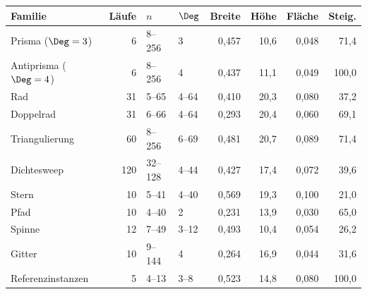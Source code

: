 \begin{tabular}{@{}lrllrrrr@{}}
\toprule
Familie & L\"aufe & $n$ & $\Deg$ & Breite & H\"ohe & Fl\"ache & Steig. \\
\midrule
Prisma ($\Deg=3$) & 6 & 8--256 & 3 & 0{,}457 & 10{,}6 & 0{,}048 & 71{,}4 \\
Antiprisma ($\Deg=4$) & 6 & 8--256 & 4 & 0{,}437 & 11{,}1 & 0{,}049 & 100{,}0 \\
Rad & 31 & 5--65 & 4--64 & 0{,}410 & 20{,}3 & 0{,}080 & 37{,}2 \\
Doppelrad & 31 & 6--66 & 4--64 & 0{,}293 & 20{,}4 & 0{,}060 & 69{,}1 \\
Triangulierung & 60 & 8--256 & 6--69 & 0{,}481 & 20{,}7 & 0{,}089 & 71{,}4 \\
Dichtesweep & 120 & 32--128 & 4--44 & 0{,}427 & 17{,}4 & 0{,}072 & 39{,}6 \\
Stern & 10 & 5--41 & 4--40 & 0{,}569 & 19{,}3 & 0{,}100 & 21{,}0 \\
Pfad & 10 & 4--40 & 2 & 0{,}231 & 13{,}9 & 0{,}030 & 65{,}0 \\
Spinne & 12 & 7--49 & 3--12 & 0{,}493 & 10{,}4 & 0{,}054 & 26{,}2 \\
Gitter & 10 & 9--144 & 4 & 0{,}264 & 16{,}9 & 0{,}044 & 31{,}6 \\
Referenzinstanzen & 5 & 4--13 & 3--8 & 0{,}523 & 14{,}8 & 0{,}080 & 100{,}0 \\
\bottomrule
\end{tabular}
